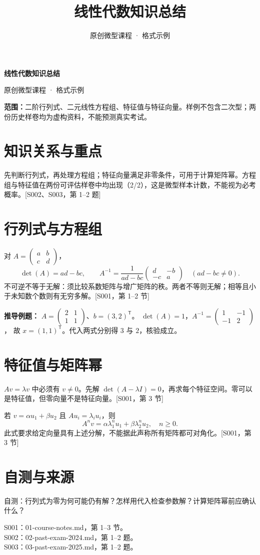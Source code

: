 \documentclass[UTF8,fontset=fandol,zihao=-4]{ctexart}
\author{原创微型课程 · 格式示例}
\date{}
\title{线性代数知识总结}
\begin{document}
\begin{center}{\LARGE\bfseries 线性代数知识总结\par}\vspace{0.6em}原创微型课程 · 格式示例\end{center}
\vspace{0.5em}
\textbf{范围：}二阶行列式、二元线性方程组、特征值与特征向量。样例不包含二次型；两份历史样卷均为虚构资料，不能预测真实考试。

\section{知识关系与重点}
先判断行列式，再处理方程组；特征向量满足非零条件，可用于计算矩阵幂。方程组与特征值在两份可评估样卷中均出现（2/2），这是微型样本计数，不能视为必考概率。[S002、S003，第 1--2 题]

\section{行列式与方程组}
对 $A=\begin{pmatrix}a&b\\c&d\end{pmatrix}$，
\[
\det(A)=ad-bc,\qquad
A^{-1}=\frac{1}{ad-bc}\begin{pmatrix}d&-b\\-c&a\end{pmatrix}
\quad(ad-bc\ne0).
\]
不可逆不等于无解：须比较系数矩阵与增广矩阵的秩。两者不等则无解；相等且小于未知数个数则有无穷多解。[S001，第 1--2 节]

\textbf{推导例题：}
$A=\begin{pmatrix}2&1\\1&1\end{pmatrix}$、$b=(3,2)^{\mathsf T}$。
$\det(A)=1$，$A^{-1}=\begin{pmatrix}1&-1\\-1&2\end{pmatrix}$，
故 $x=(1,1)^{\mathsf T}$。代入两式分别得 $3$ 与 $2$，核验成立。

\section{特征值与矩阵幂}
$Av=\lambda v$ 中必须有 $v\ne0$。先解 $\det(A-\lambda I)=0$，再求每个特征空间。零可以是特征值，但零向量不是特征向量。[S001，第 3 节]

若 $v=\alpha u_1+\beta u_2$ 且 $Au_i=\lambda_i u_i$，则
\[
A^n v=\alpha\lambda_1^n u_1+\beta\lambda_2^n u_2,\quad n\ge0.
\]
此式要求给定向量具有上述分解，不能据此声称所有矩阵都可对角化。[S001，第 3 节]

\section{自测与来源}
自测：行列式为零为何可能仍有解？怎样用代入检查参数解？计算矩阵幂前应确认什么？

S001：01-course-notes.md，第 1--3 节。\\
S002：02-past-exam-2024.md，第 1--2 题。\\
S003：03-past-exam-2025.md，第 1--2 题。
\end{document}
